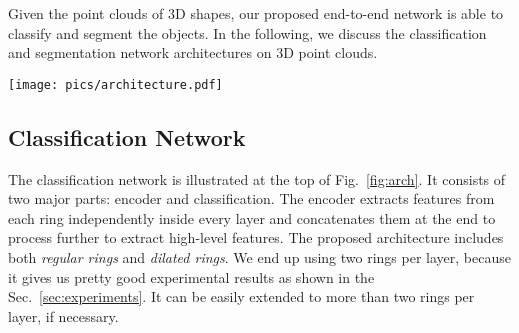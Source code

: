 \documentclass[10pt,twocolumn,letterpaper]{article}
\begin{document}
Given the point clouds of 3D shapes, our proposed end-to-end network is able to classify and segment the objects. In the following, we discuss the classification and segmentation network architectures on 3D point clouds.

\begin{figure*}[t]
\begin{center}
  \texttt{[image: pics/architecture.pdf]}\vspace{-5mm}
\end{center}
\caption{The architecture of A-CNN. Both classification and segmentation networks share encoder part for the feature extraction. Normals are used only to determine the order of neighboring points in the local regions (dashed arrows mean no backpropagation during training) and not used as additional features, unless it is mentioned explicitly in the experiments. , ,  (where ) are the numbers of points as input, after  the first and second layer, respectively.  and  are the unordered and ordered points inside the local rings, respectively.  is the number of classification classes.  is the number of segmentation classes. ``FPS'' stands for Farthest Point Sampling algorithm. ``mlp'' stands for multi-layer perceptron.  stands for annular convolutions with the kernel size  applied sequentially with corresponding feature map sizes .}\vspace{-3mm}
\centering
\label{fig:arch}
\end{figure*}
\vspace{-1mm}
\subsection{Classification Network}\vspace{-1mm}
The classification network is illustrated at the top of Fig.~\ref{fig:arch}. It consists of two major parts: encoder and classification. The encoder extracts features from each ring independently inside every layer and concatenates them at the end to process further to extract high-level features. The proposed architecture includes both \emph{regular rings} and \emph{dilated rings}. We end up using two rings per layer, because it gives us pretty good experimental results as shown in the Sec.~\ref{sec:experiments}. It can be easily extended to more than two rings per layer, if necessary.
\end{document}
